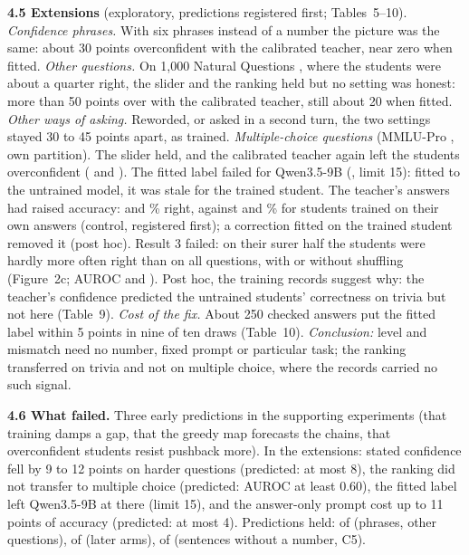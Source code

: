 \documentclass[10pt]{article}
\begin{document}
\textbf{4.5 Extensions} (exploratory, predictions registered first; Tables~5--10). \emph{Confidence phrases.} With six phrases instead of a number the picture was the same: about 30 points overconfident with the calibrated teacher, near zero when fitted. \emph{Other questions.} On 1{,}000 Natural Questions \cite{nq}, where the students were about a quarter right, the slider and the ranking held but no setting was honest: more than 50 points over with the calibrated teacher, still about 20 when fitted. \emph{Other ways of asking.} Reworded, or asked in a second turn, the two settings stayed 30 to 45 points apart, as trained. \emph{Multiple-choice questions} (MMLU-Pro \cite{mmlupro}, own partition). The slider held, and the calibrated teacher again left the students overconfident (\mQTcalGap{} and \mGTcalGap{}). The fitted label failed for Qwen3.5-9B (\mQScalGap{}, limit 15): fitted to the untrained model, it was stale for the trained student. The teacher's answers had raised accuracy: \mQScalAcc{} and \mGScalAcc{}\% right, against \nQOwnAccR{} and \nGOwnAccR{}\% for students trained on their own answers (control, registered first); a correction fitted on the trained student removed it (post hoc). Result 3 failed: on their surer half the students were hardly more often right than on all questions, with or without shuffling (Figure~2c; AUROC \mQTcalAuroc{} and \mGTcalAuroc{}). Post hoc, the training records suggest why: the teacher's confidence predicted the untrained students' correctness on trivia but not here (Table~9). \emph{Cost of the fix.} About 250 checked answers put the fitted label within 5 points in nine of ten draws (Table~10). \emph{Conclusion:} level and mismatch need no number, fixed prompt or particular task; the ranking transferred on trivia and not on multiple choice, where the records carried no such signal.

\textbf{4.6 What failed.} Three early predictions in the supporting experiments (that training damps a gap, that the greedy map forecasts the chains, that overconfident students resist pushback more). In the extensions: stated confidence fell by 9 to 12 points on harder questions (predicted: at most 8), the ranking did not transfer to multiple choice (predicted: AUROC at least 0.60), the fitted label left Qwen3.5-9B at \mQScalGap{} there (limit 15), and the answer-only prompt cost up to 11 points of accuracy (predicted: at most 4). Predictions held: \xPredHeld{} of \xPredAll{} (phrases, other questions), \latePredHeld{} of \latePredAll{} (later arms), \zPredHeld{} of \zPredAll{} (sentences without a number, C5).
\end{document}
